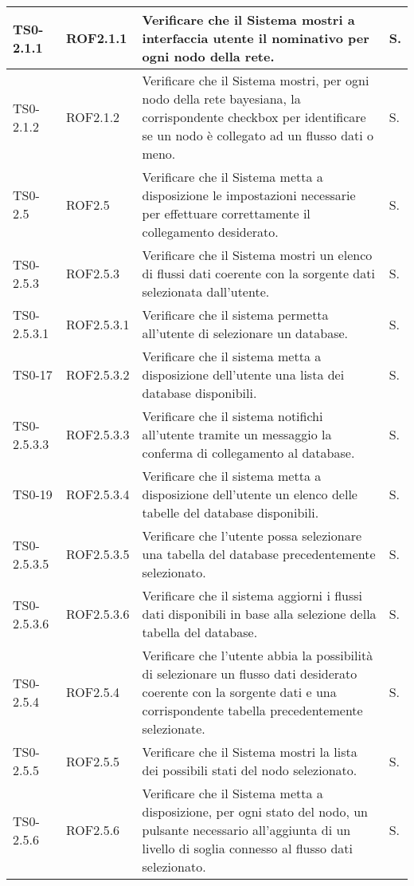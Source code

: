 \begin{longtable}{|C{.15\textwidth}|C{.14\textwidth}|m{.52\textwidth}|m{.08\textwidth}|}
\hline
TS0-2.1.1 & ROF2.1.1 & Verificare che il Sistema mostri a interfaccia utente il nominativo per ogni nodo della rete.& S.\\
\hline
{} TS0-2.1.2 & ROF2.1.2 & Verificare che il Sistema mostri, per ogni nodo della rete bayesiana, la corrispondente checkbox per identificare se un nodo è collegato ad un flusso dati o meno. & S. \\
\hline
TS0-2.5 & ROF2.5 & Verificare che il Sistema metta a disposizione le impostazioni necessarie per effettuare correttamente il collegamento desiderato. & S. \\ 
\hline
{}TS0-2.5.3 & ROF2.5.3 & Verificare che il Sistema mostri un elenco di flussi dati coerente con la sorgente dati selezionata dall'utente. & S. \\
\hline
TS0-2.5.3.1 & ROF2.5.3.1 & Verificare che il sistema permetta all'utente di selezionare un database. & S. \\ 
\hline
{}TS0-17 & ROF2.5.3.2 & Verificare che il sistema metta a disposizione dell'utente una lista dei database disponibili. & S. \\ 
\hline
TS0-2.5.3.3 & ROF2.5.3.3 & Verificare che il sistema notifichi all'utente tramite un messaggio la conferma di collegamento al database. & S. \\
\hline 
{}TS0-19 & ROF2.5.3.4 & Verificare che il sistema metta a disposizione dell'utente un elenco delle tabelle del database disponibili. & S. \\
\hline
TS0-2.5.3.5 & ROF2.5.3.5 & Verificare che l'utente possa selezionare una tabella del database precedentemente selezionato. & S. \\
\hline
{}TS0-2.5.3.6 & ROF2.5.3.6 & Verificare che il sistema aggiorni i flussi dati disponibili in base alla selezione della tabella del database. & S. \\ 
\hline
TS0-2.5.4 & ROF2.5.4 & Verificare che l'utente abbia la possibilità di selezionare un flusso dati desiderato coerente con la sorgente dati e  una corrispondente tabella precedentemente selezionate. & S. \\ 
\hline
{}TS0-2.5.5 & ROF2.5.5 & Verificare che il Sistema mostri la lista dei possibili stati del nodo selezionato. & S. \\ 
\hline
TS0-2.5.6 & ROF2.5.6 & Verificare che il Sistema metta a disposizione, per ogni stato del nodo, un pulsante necessario all'aggiunta di un livello di soglia connesso al flusso dati selezionato. & S. \\

\end{longtable}
